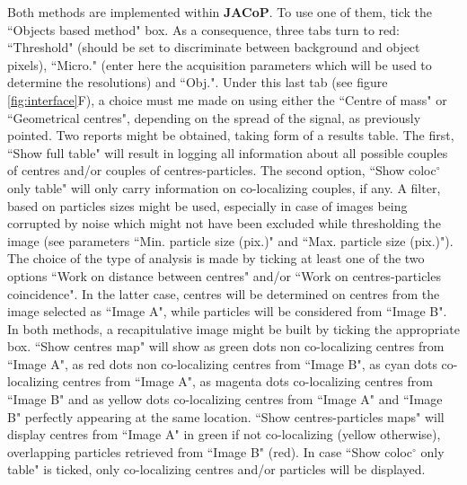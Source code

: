 \documentclass[]{spie}  %
\begin{document}
Both methods are implemented within \textbf{JACoP}. To use one of them, tick the ``Objects based method" box. As a consequence, three tabs turn to red: ``Threshold" (should be set  to discriminate between background and object pixels), ``Micro." (enter here the acquisition parameters which will be used to determine the resolutions) and ``Obj.". Under this last tab (see figure \ref{fig:interface}F), a choice must me made on using either the ``Centre of mass" or ``Geometrical centres", depending on the spread of the signal, as previously pointed. Two reports might be obtained, taking form of a results table. The first, ``Show full table" will result in logging all information about all possible couples of centres and/or couples of centres-particles. The second option, ``Show coloc$^\circ$ only table" will only carry information on co-localizing couples, if any. A filter, based on particles sizes might be used, especially in case of images being corrupted by noise which might not have been excluded while thresholding the image (see parameters ``Min. particle size (pix.)" and ``Max. particle size (pix.)"). The choice of the type of analysis is made by ticking at least one of the two options ``Work on distance between centres" and/or ``Work on centres-particles coincidence". In the latter case, centres will be determined on centres from the image selected as ``Image A", while particles will be considered from ``Image B". In both methods, a recapitulative image might be built by ticking the appropriate box. ``Show centres map" will show as green dots non co-localizing centres from ``Image A", as red dots non co-localizing centres from ``Image B", as cyan dots co-localizing centres from ``Image A", as magenta dots co-localizing centres from ``Image B" and as yellow dots co-localizing centres from ``Image A" and ``Image B" perfectly appearing at the same location. ``Show centres-particles maps" will display centres from ``Image A" in green if not co-localizing (yellow otherwise), overlapping particles retrieved from ``Image B" (red). In case ``Show coloc$^\circ$ only table" is ticked, only co-localizing centres and/or particles will be displayed.
\end{document}
